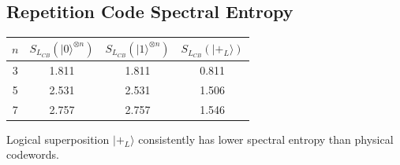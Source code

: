 \documentclass[11pt,a4paper]{article}
\theoremstyle{plain}
\theoremstyle{definition}
\theoremstyle{remark}
\newcommand{\ket}[1]{|#1\rangle}
\begin{document}
\subsection{Repetition Code Spectral Entropy}

\begin{center}
\begin{tabular}{c|ccc}
\toprule
$n$ & $S_{L_{CB}}(\ket{0}^{\otimes n})$ & $S_{L_{CB}}(\ket{1}^{\otimes n})$ & $S_{L_{CB}}(\ket{+_L})$ \\
\midrule
3 & 1.811 & 1.811 & 0.811 \\
5 & 2.531 & 2.531 & 1.506 \\
7 & 2.757 & 2.757 & 1.546 \\
\bottomrule
\end{tabular}
\end{center}

Logical superposition $\ket{+_L}$ consistently has lower spectral entropy than physical codewords.
\end{document}
